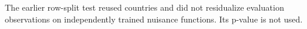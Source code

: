\begin{table}[htbp]\centering
\caption{Forest calibration inference withdrawn}
\label{tab:cfblp}
\small
{}
\begin{tablenotes}\footnotesize The earlier row-split test reused countries and did not residualize evaluation observations on independently trained nuisance functions. Its p-value is not used.\end{tablenotes}
\end{table}